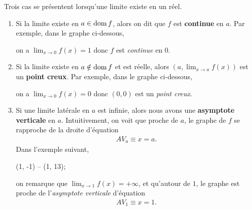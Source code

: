 \documentclass[main.tex]{subfiles}
\begin{document}
Trois cas se présentent lorsqu'une limite existe en un réel.

\begin{enumerate}
    \item Si la limite existe en $a \in \operatorname{dom} f$,
        alors on dit que $f$ est \textbf{continue} en $a$.
        Par exemple,
        dans le graphe ci-dessous,
        \begin{center}
            \begin{plot}{0.5}{-6}{-1}{6}{3}
            \end{plot}
        \end{center}
        on a $\lim_{x \to 0} f(x) = 1$ donc $f$ est \emph{continue} en $0$.
    \item Si la limite existe en $a \notin \operatorname{dom} f$ et est réelle,
        alors $(a, \lim_{x \to a} f(x))$ est un \textbf{point creux}.
        Par exemple,
        dans le graphe ci-dessous,
        \begin{center}
            \begin{plot}{0.5}{-6}{-2}{6}{2}
            \end{plot}
        \end{center}
        on a $\lim_{x \to 0} f(x) = 0$ donc $(0, 0)$ est un \emph{point creux}.
    \item Si une limite latérale en $a$ est infinie,
        alors nous avons une \textbf{asymptote verticale} en $a$.
        Intuitivement,
        on voit que proche de $a$,
        le graphe de $f$ se rapproche de la droite d'équation
        \begin{align}
            AV_a \equiv x = a.
        \end{align}
        Dans l'exemple suivant,
        \begin{center}
            \begin{plot}{0.25}{-6}{-1}{6}{12}
                \drawline (1, -1) -- (1, 13);
            \end{plot}
        \end{center}
        on remarque que $\lim_{x \to 1} f(x) = +\infty$,
        et qu'autour de $1$,
        le graphe est proche de l'\emph{asymptote verticale} d'équation
        \begin{align}
            AV_1 \equiv x = 1.
        \end{align}
\end{enumerate}
\end{document}
